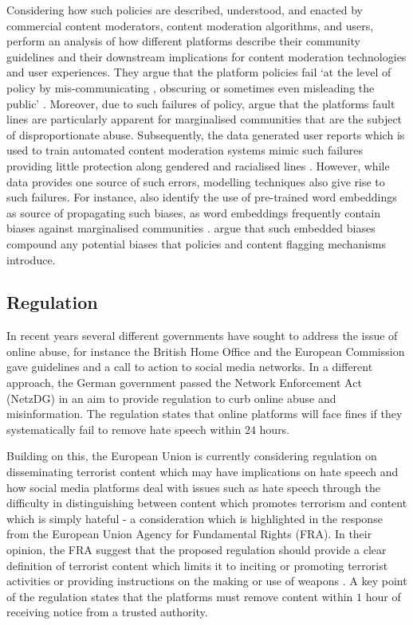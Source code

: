 Considering how such policies are described, understood, and enacted by commercial content moderators, content moderation algorithms, and users, \citet{Kirtz:2021} perform an analysis of how different platforms describe their community guidelines and their downstream implications for content moderation technologies and user experiences. They argue that the platform policies fail `at the level of policy by mis-communicating , obscuring or sometimes even misleading the public' \citep[p. 5]{Kirtz:2021}. Moreover, due to such failures of policy, \citet{Kirtz:2021} argue that the platforms fault lines are particularly apparent for marginalised communities that are the subject of disproportionate abuse. Subsequently, the data generated user reports which is used to train automated content moderation systems mimic such failures providing little protection along gendered and racialised lines \citep{Kirtz:2021,Waseem:2018}. However, while data provides one source of such errors, modelling techniques also give rise to such failures. For instance, \citet{Kirtz:2021} also identify the use of pre-trained word embeddings as source of propagating such biases, as word embeddings frequently contain biases against marginalised communities \citep{Speer:2017}. \citet{Kirtz:2021} argue that such embedded biases compound any potential biases that policies and content flagging mechanisms introduce.

\subsection{Regulation}
In recent years several different governments have sought to address the issue of online abuse, for instance the British Home Office \citep{HomeOffice:2016} and the European Commission \citep{EUCommission:2016} gave guidelines and a call to action to social media networks.
In a different approach, the German government passed the Network Enforcement Act (NetzDG) \citep{NetzDG:2017} in an aim to provide regulation to curb online abuse and misinformation.
The regulation states that online platforms will face fines if they systematically fail to remove hate speech within $24$ hours.

Building on this, the European Union is currently considering regulation on disseminating terrorist content which may have implications on hate speech and how social media platforms deal with issues such as hate speech \citep{EUCommission:2018} through the difficulty in distinguishing between content which promotes terrorism and content which is simply hateful - a consideration which is highlighted in the response from the European Union Agency for Fundamental Rights (FRA).
In their opinion, the FRA suggest that the proposed regulation should provide a clear definition of terrorist content which limits it to inciting or promoting terrorist activities or providing instructions on the making or use of weapons \citep{FRA:2019}.
A key point of the regulation states that the platforms must remove content within $1$ hour of receiving notice from a trusted authority.

